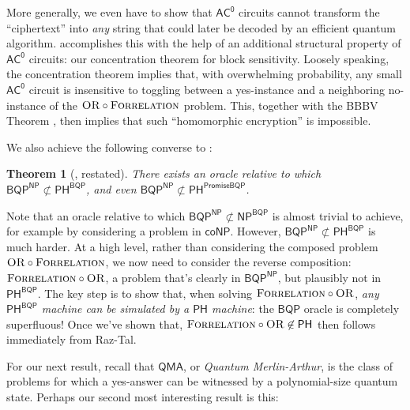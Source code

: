 \documentclass[10pt,a4paper]{article}
\newtheorem{theorem}{Theorem}
\newcommand{\OR}{\normalfont\textsc{OR}}
\newcommand{\Forrelation}{\normalfont\textsc{Forrelation}}
\begin{document}
More generally, we even have to show that $\mathsf{AC^0}$ circuits cannot transform the ``ciphertext'' into \textit{any} string that could later be decoded by an efficient quantum algorithm.  accomplishes this with the help of an additional structural property of $\mathsf{AC^0}$ circuits: our concentration theorem for block sensitivity. Loosely speaking, the concentration theorem implies that, with
overwhelming probability, any small $\mathsf{AC^0}$ circuit is insensitive to toggling between a yes-instance and a neighboring no-instance of the $\OR \circ \Forrelation$ problem.  This, together with the BBBV Theorem \cite{BBBV97}, then implies that such ``homomorphic encryption'' is impossible.

\bigskip

We also achieve the following converse to :

\begin{theorem}[, restated]
\label{thm:bqp^np_not_in_ph^bqp_intro}
There exists an oracle relative to which $\mathsf{BQP}^\mathsf{NP} \not\subset \mathsf{PH}^\mathsf{BQP}$, and even $\mathsf{BQP}^\mathsf{NP} \not\subset \mathsf{PH}^\mathsf{PromiseBQP}$.
\end{theorem}

Note that an oracle relative to which $\mathsf{BQP}^\mathsf{NP} \not\subset \mathsf{NP}^\mathsf{BQP}$ is almost trivial to achieve, for example by considering a problem in $\mathsf{coNP}$.  However, $\mathsf{BQP}^\mathsf{NP} \not\subset \mathsf{PH}^\mathsf{BQP}$ is much harder.  At a high level, rather than considering the composed problem $\OR \circ \Forrelation$, we now need to consider the reverse composition: $\Forrelation \circ \OR$, a problem that's clearly in $\mathsf{BQP}^\mathsf{NP}$, but plausibly not in $\mathsf{PH}^\mathsf{BQP}$. The key step is to show that, when solving $\Forrelation \circ \OR$, \textit{any $\mathsf{PH}^\mathsf{BQP}$ machine can be simulated by a $\mathsf{PH}$ machine}: the $\mathsf{BQP}$ oracle is completely superfluous!  Once we've shown that, $\Forrelation \circ \OR \not \in \mathsf{PH}$ then follows immediately from Raz-Tal.

\bigskip

For our next result, recall that $\mathsf{QMA}$, or \textit{Quantum Merlin-Arthur}, is the class of problems for which a yes-answer can be witnessed by a polynomial-size quantum state. Perhaps our second most interesting result is this:
\end{document}
